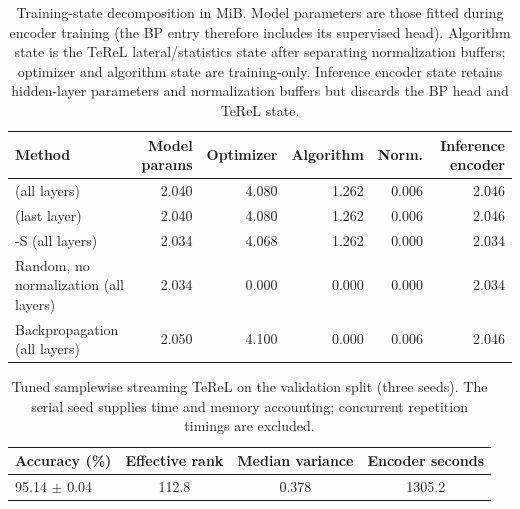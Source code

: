 \begin{table}[H]
\centering
\small
\caption{Training-state decomposition in MiB. Model parameters are those fitted during encoder training (the BP entry therefore includes its supervised head). Algorithm state is the TeReL lateral/statistics state after separating normalization buffers; optimizer and algorithm state are training-only. Inference encoder state retains hidden-layer parameters and normalization buffers but discards the BP head and TeReL state.}
\label{tab:training-state-decomposition}
\begin{tabular}{lrrrrr}
\toprule
Method & Model params & Optimizer & Algorithm & Norm. & Inference encoder \\
\midrule
\TeReL{} (all layers) & 2.040 & 4.080 & 1.262 & 0.006 & 2.046 \\
\TeReL{} (last layer) & 2.040 & 4.080 & 1.262 & 0.006 & 2.046 \\
\TeReL{}-S (all layers) & 2.034 & 4.068 & 1.262 & 0.000 & 2.034 \\
Random, no normalization (all layers) & 2.034 & 0.000 & 0.000 & 0.000 & 2.034 \\
Backpropagation (all layers) & 2.050 & 4.100 & 0.000 & 0.006 & 2.046 \\
\bottomrule
\end{tabular}
\end{table}

\begin{table}[H]
\centering
\caption{Tuned samplewise streaming TeReL on the validation split (three seeds). The serial seed supplies time and memory accounting; concurrent repetition timings are excluded.}
\label{tab:streaming-v2}
\begin{tabular}{lccc}
\toprule
Accuracy (\%) & Effective rank & Median variance & Encoder seconds \\
\midrule
95.14 $\pm$ 0.04 & 112.8 & 0.378 & 1305.2 \\
\bottomrule
\end{tabular}
\end{table}
